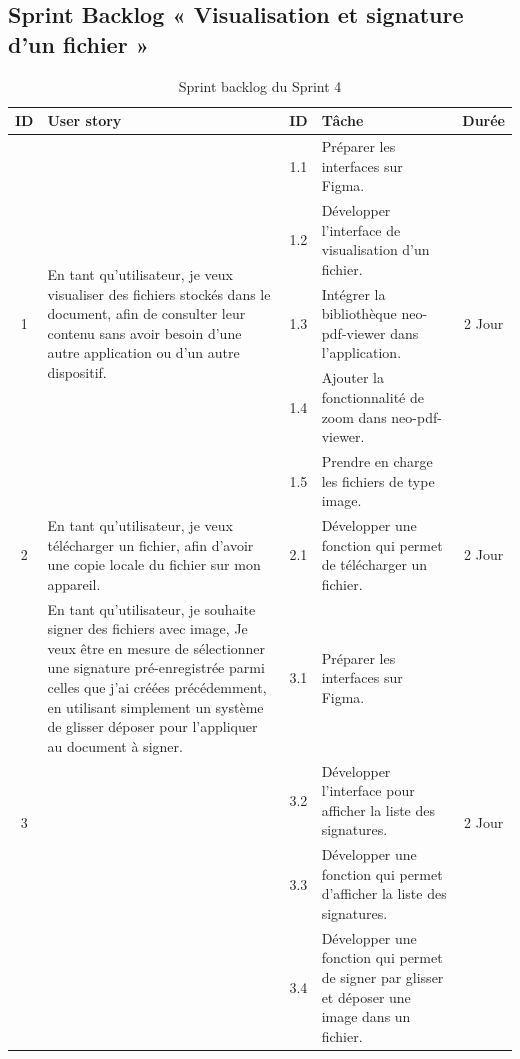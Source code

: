 \subsection{Sprint Backlog « Visualisation et signature d'un fichier »}

\begin{adjustwidth}{-1cm}{}
    
    \begin{longtable}{|c|p{6cm}|c|p{6cm}|c|}
      \caption{Sprint backlog du Sprint 4} \label{tab:sprint-backlog-4} \\
      \hline
      \textbf{ID} & \textbf{User story} & \textbf{ID}  & \textbf{Tâche} & \textbf{Durée} \\
      \hline
      \multirow{5}{*}{1} & \multirow{5}{6cm}{En tant qu'utilisateur, je veux visualiser des fichiers stockés dans le document, afin de consulter leur contenu sans avoir besoin d'une autre application ou d'un autre dispositif.} & 1.1 & Préparer les interfaces sur Figma. & \multirow{5}{*}{2 Jour} \\
      \cline{3-4}
      & & 1.2 & Développer l'interface de visualisation d'un fichier. & \\
      \cline{3-4}
      & & 1.3 & Intégrer la bibliothèque neo-pdf-viewer dans l'application. & \\
      \cline{3-4}
      & & 1.4 & Ajouter la fonctionnalité de zoom dans neo-pdf-viewer. & \\
      \cline{3-4}
      & & 1.5 & Prendre en charge les fichiers de type image. & \\
      \cline{1-5}

      \multirow{1}{*}{2} & En tant qu'utilisateur, je veux télécharger un fichier, afin d'avoir une copie locale du fichier sur mon appareil. & 2.1 & Développer une fonction qui permet de télécharger un fichier. & \multirow{1}{*}{2 Jour} \\
      \cline{1-5}

      \multirow{4}{*}{3} & En tant qu'utilisateur, je souhaite signer des fichiers avec image, Je veux être en mesure de sélectionner une signature pré-enregistrée parmi celles que j'ai créées précédemment, en utilisant simplement un système de glisser déposer pour l'appliquer au document à signer.& 3.1 & Préparer les interfaces sur Figma. & \multirow{4}{*}{2 Jour} \\
      \cline{3-4}
      & & 3.2 & Développer l'interface pour afficher la liste des signatures. & \\
      \cline{3-4}
      & & 3.3 & Développer une fonction qui permet d'afficher la liste des signatures. & \\
      \cline{3-4}
      & & 3.4 & Développer une fonction qui permet de signer par glisser et déposer une image dans un fichier. & \\
      \cline{1-5}


\end{longtable}
\end{adjustwidth}
